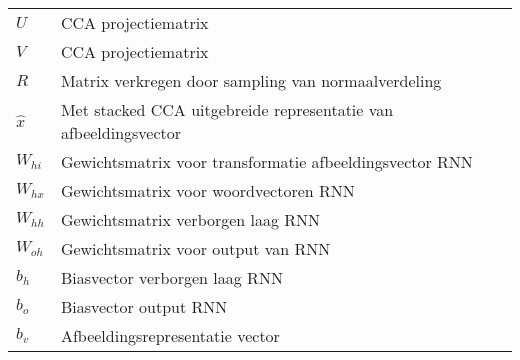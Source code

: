 \documentclass[master=cws,masteroption=ai]{kulemt}
\begin{document}
\begin{flushleft}
\begin{tabularx}{\textwidth}{@{}p{25mm}X@{}}
	$U$ 		& CCA projectiematrix\\
	$V$			& CCA projectiematrix \\
	$R$			& Matrix verkregen door sampling van normaalverdeling\\
	$\hat{x}$	& Met stacked CCA uitgebreide representatie van afbeeldingsvector\\
	$W_{hi}$    & Gewichtsmatrix voor transformatie afbeeldingsvector RNN\\
	$W_{hx}$    & Gewichtsmatrix voor woordvectoren RNN\\
	$W_{hh}$     & Gewichtsmatrix verborgen laag RNN\\
	$W_{oh}$    & Gewichtsmatrix voor output van RNN\\
	$b_h$       & Biasvector verborgen laag RNN\\
	$b_o$       & Biasvector output RNN\\
	$b_v$		& Afbeeldingsrepresentatie vector \\
	  \end{tabularx}
	\end{flushleft}
	
\end{document}
